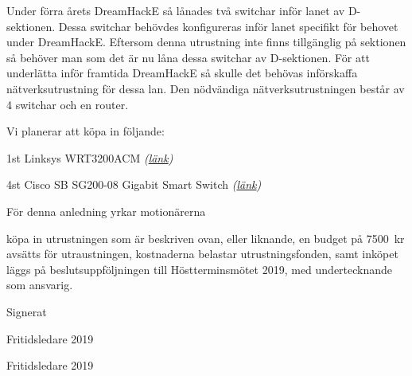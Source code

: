 \documentclass[../_main/handlingar.tex]{subfiles}
\begin{document}


Under förra årets DreamHackE så lånades två switchar inför lanet av D-sektionen. Dessa switchar behövdes konfigureras inför lanet specifikt för behovet under DreamHackE. Eftersom denna utrustning inte finns tillgänglig på sektionen så behöver man som det är nu låna dessa switchar av D-sektionen. För att underlätta inför framtida DreamHackE så skulle det behövas införskaffa nätverksutrustning för dessa lan. Den nödvändiga nätverksutrustningen består av 4 switchar och en router. 

Vi planerar att köpa in följande: 

1st Linksys WRT3200ACM \textit{(\href{https://www.netonnet.se/art/dator/natverk/router/linksys-wrt3200acm/238881.8935/}{länk})}

4st Cisco SB SG200-08 Gigabit Smart Switch \textit{(\href{https://www.komplett.se/product/638869/datorutrustning/natverk/switchar/cisco-sb-sg200-08-gigabit-smart-switch}{länk})}


För denna anledning yrkar motionärerna
    \begin{attsatser}
       \att köpa in utrustningen som är beskriven ovan, eller liknande,
       \att en budget på \SI{7500}{kr} avsätts för utraustningen,
       \att kostnaderna belastar utrustningsfonden, samt
       \att inköpet läggs på beslutsuppföljningen till Höstterminsmötet 2019, med undertecknande som ansvarig.
    \end{attsatser}
    


\begin{signatures}{2}
        Signerat
        \signature{Vincent Palmer}{Fritidsledare 2019}
        \signature{Marcus Oknelid}{Fritidsledare 2019}
    \end{signatures}
\end{document}
